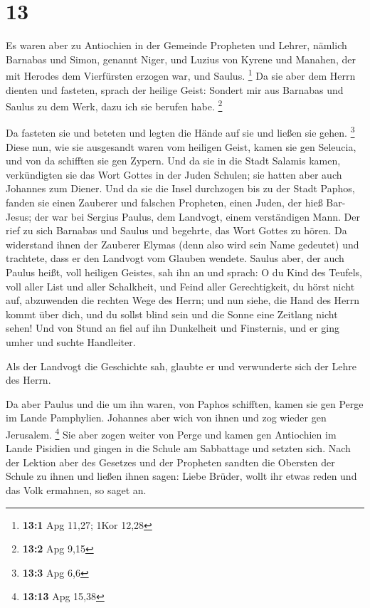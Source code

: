 \hypertarget{section-4}{%
\section{13}\label{section-4}}

 Es waren aber zu Antiochien in der Gemeinde Propheten und
Lehrer, nämlich Barnabas und Simon, genannt Niger, und Luzius von Kyrene
und Manahen, der mit Herodes dem Vierfürsten erzogen war, und Saulus.
\footnote{\textbf{13:1} Apg 11,27; 1Kor 12,28}  Da sie aber
dem Herrn dienten und fasteten, sprach der heilige Geist: Sondert mir
aus Barnabas und Saulus zu dem Werk, dazu ich sie berufen habe.
\footnote{\textbf{13:2} Apg 9,15}

 Da fasteten sie und beteten und legten die Hände auf sie
und ließen sie gehen. \footnote{\textbf{13:3} Apg 6,6} 
Diese nun, wie sie ausgesandt waren vom heiligen Geist, kamen sie gen
Seleucia, und von da schifften sie gen Zypern.  Und da sie
in die Stadt Salamis kamen, verkündigten sie das Wort Gottes in der
Juden Schulen; sie hatten aber auch Johannes zum Diener. 
Und da sie die Insel durchzogen bis zu der Stadt Paphos, fanden sie
einen Zauberer und falschen Propheten, einen Juden, der hieß Bar-Jesus;
 der war bei Sergius Paulus, dem Landvogt, einem
verständigen Mann. Der rief zu sich Barnabas und Saulus und begehrte,
das Wort Gottes zu hören.  Da widerstand ihnen der Zauberer
Elymas (denn also wird sein Name gedeutet) und trachtete, dass er den
Landvogt vom Glauben wendete.  Saulus aber, der auch Paulus
heißt, voll heiligen Geistes, sah ihn an  und sprach: O du
Kind des Teufels, voll aller List und aller Schalkheit, und Feind aller
Gerechtigkeit, du hörst nicht auf, abzuwenden die rechten Wege des
Herrn;  und nun siehe, die Hand des Herrn kommt über dich,
und du sollst blind sein und die Sonne eine Zeitlang nicht sehen! Und
von Stund an fiel auf ihn Dunkelheit und Finsternis, und er ging umher
und suchte Handleiter.

 Als der Landvogt die Geschichte sah, glaubte er und
verwunderte sich der Lehre des Herrn.

 Da aber Paulus und die um ihn waren, von Paphos schifften,
kamen sie gen Perge im Lande Pamphylien. Johannes aber wich von ihnen
und zog wieder gen Jerusalem. \footnote{\textbf{13:13} Apg 15,38}
 Sie aber zogen weiter von Perge und kamen gen Antiochien
im Lande Pisidien und gingen in die Schule am Sabbattage und setzten
sich.  Nach der Lektion aber des Gesetzes und der Propheten
sandten die Obersten der Schule zu ihnen und ließen ihnen sagen: Liebe
Brüder, wollt ihr etwas reden und das Volk ermahnen, so saget an.

